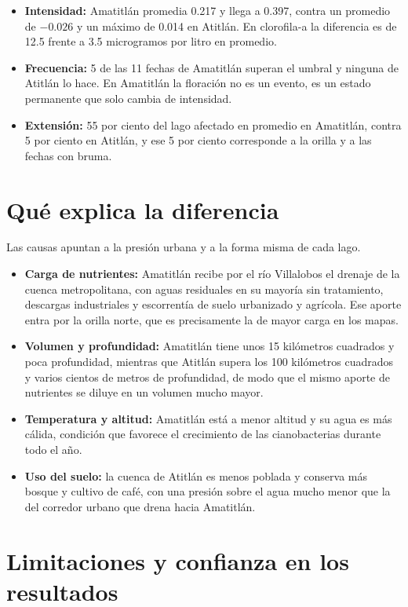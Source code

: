 \documentclass[10pt,a4paper]{article}
\begin{document}
\begin{itemize}
  \item \textbf{Intensidad:} Amatitlán promedia 0.217 y llega a 0.397, contra un promedio de $-0.026$ y un máximo de
  0.014 en Atitlán. En clorofila-a la diferencia es de 12.5 frente a 3.5 microgramos por litro en promedio.
  \item \textbf{Frecuencia:} 5 de las 11 fechas de Amatitlán superan el umbral y ninguna de Atitlán lo hace. En
  Amatitlán la floración no es un evento, es un estado permanente que solo cambia de intensidad.
  \item \textbf{Extensión:} 55 por ciento del lago afectado en promedio en Amatitlán, contra 5 por ciento en
  Atitlán, y ese 5 por ciento corresponde a la orilla y a las fechas con bruma.
\end{itemize}

\section{Qué explica la diferencia}

Las causas apuntan a la presión urbana y a la forma misma de cada lago.

\begin{itemize}
  \item \textbf{Carga de nutrientes:} Amatitlán recibe por el río Villalobos el drenaje de la cuenca metropolitana,
  con aguas residuales en su mayoría sin tratamiento, descargas industriales y escorrentía de suelo urbanizado y
  agrícola. Ese aporte entra por la orilla norte, que es precisamente la de mayor carga en los mapas.
  \item \textbf{Volumen y profundidad:} Amatitlán tiene unos 15 kilómetros cuadrados y poca profundidad, mientras
  que Atitlán supera los 100 kilómetros cuadrados y varios cientos de metros de profundidad, de modo que el mismo
  aporte de nutrientes se diluye en un volumen mucho mayor.
  \item \textbf{Temperatura y altitud:} Amatitlán está a menor altitud y su agua es más cálida, condición que
  favorece el crecimiento de las cianobacterias durante todo el año.
  \item \textbf{Uso del suelo:} la cuenca de Atitlán es menos poblada y conserva más bosque y cultivo de café, con
  una presión sobre el agua mucho menor que la del corredor urbano que drena hacia Amatitlán.
\end{itemize}

\section{Limitaciones y confianza en los resultados}
\end{document}
